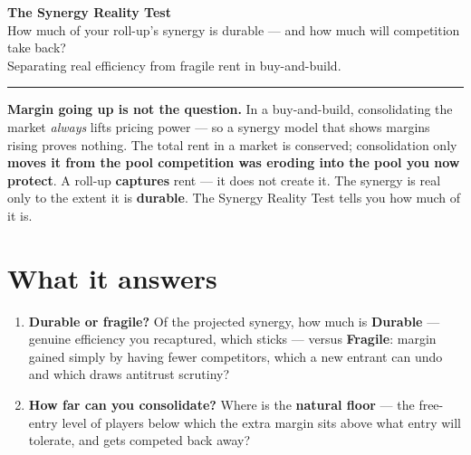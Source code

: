 \documentclass[11pt]{article}
\newcommand{\durable}{\textcolor{creoaccent}{\textbf{Durable}}}
\newcommand{\fragile}{\textcolor{gray!55!black}{\textbf{Fragile}}}
\begin{document}
\begin{center}
{\LARGE\bfseries\color{creonavy} The Synergy Reality Test}\\[4pt]
{\large\color{creoaccent} How much of your roll-up's synergy is durable --- and how much
will competition take back?}\\[5pt]
{\normalsize Separating real efficiency from fragile rent in buy-and-build.}
\end{center}

\vspace{2pt}\hrule\vspace{8pt}

\begin{hook}
\textbf{Margin going up is not the question.} In a buy-and-build, consolidating the market
\emph{always} lifts pricing power --- so a synergy model that shows margins rising proves
nothing. The total rent in a market is conserved; consolidation only \textbf{moves it from the
pool competition was eroding into the pool you now protect}. A roll-up \textbf{captures} rent ---
it does not create it. The synergy is real only to the extent it is \textbf{durable}. The Synergy
Reality Test tells you how much of it is.
\end{hook}

\section{What it answers}
\begin{enumerate}[leftmargin=1.6em]
  \item \textbf{Durable or fragile?} Of the projected synergy, how much is \durable{} ---
  genuine efficiency you recaptured, which sticks --- versus \fragile{}: margin gained
  simply by having fewer competitors, which a new entrant can undo and which draws antitrust
  scrutiny?
  \item \textbf{How far can you consolidate?} Where is the \textbf{natural floor} --- the
  free-entry level of players below which the extra margin sits above what entry will tolerate,
  and gets competed back away?
\end{enumerate}
\end{document}
